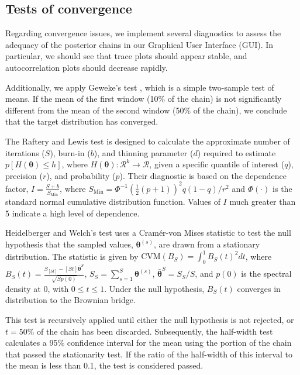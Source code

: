 \cite{geweke2004getting}

\subsection{Tests of convergence}

Regarding convergence issues, we implement several diagnostics to assess the adequacy of the posterior chains \cite{Plummer2016} in our Graphical User Interface (GUI). In particular, we should see that trace plots should appear stable, and autocorrelation plots should decrease rapidly. 

Additionally, we apply Geweke's test \cite{Geweke1992}, which is a simple two-sample test of means. If the mean of the first window (10\% of the chain) is not significantly different from the mean of the second window (50\% of the chain), we conclude that the target distribution has converged.

The Raftery and Lewis test \cite{Raftery1992} is designed to calculate the approximate number of iterations ($S$), burn-in ($b$), and thinning parameter ($d$) required to estimate $p\left[H(\bm{\theta}) \leq h\right]$, where $H(\bm{\theta}): \mathcal{R}^k \rightarrow \mathcal{R}$, given a specific quantile of interest ($q$), precision ($r$), and probability ($p$). Their diagnostic is based on the dependence factor, $I = \frac{S + b}{S_{\text{Min}}}$, where $S_{\text{Min}} = \Phi^{-1}\left(\frac{1}{2}(p+1)\right)^2 q(1-q) / r^2$ and $\Phi(\cdot)$ is the standard normal cumulative distribution function. Values of $I$ much greater than 5 indicate a high level of dependence.

Heidelberger and Welch's test \cite{Heidelberger1983} uses a Cramér-von Mises statistic to test the null hypothesis that the sampled values, $\bm{\theta}^{(s)}$, are drawn from a stationary distribution. The statistic is given by $\text{CVM}(B_S) = \int_0^1 B_S(t)^2 dt$, where $B_S(t) = \frac{S_{\left[St\right]} - \left[St\right] \bar{\bm{\theta}}^S}{\sqrt{S p(0)}}$, $S_S = \sum_{s=1}^S \bm{\theta}^{(s)}$, $\bar{\bm{\theta}}^S = S_S / S$, and $p(0)$ is the spectral density at 0, with $0 \leq t \leq 1$. Under the null hypothesis, $B_S(t)$ converges in distribution to the Brownian bridge. 

This test is recursively applied until either the null hypothesis is not rejected, or $t = 50\%$ of the chain has been discarded. Subsequently, the half-width test calculates a 95\% confidence interval for the mean using the portion of the chain that passed the stationarity test. If the ratio of the half-width of this interval to the mean is less than 0.1, the test is considered passed.\\


